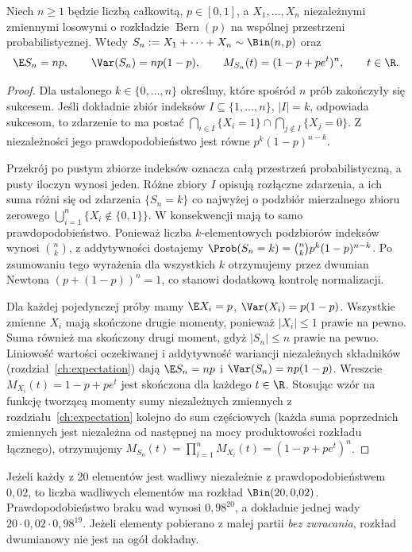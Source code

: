 \begin{twierdzenie}
Niech $n\geq1$ będzie liczbą całkowitą, $p\in[0,1]$,
a $X_1,\ldots,X_n$ niezależnymi zmiennymi losowymi
o rozkładzie $\operatorname{Bern}(p)$ na wspólnej
przestrzeni probabilistycznej. Wtedy
$S_n:=X_1+\cdots+X_n\sim\Bin(n,p)$ oraz
\[
\E S_n=np,\qquad \Var(S_n)=np(1-p),\qquad
M_{S_n}(t)=(1-p+pe^t)^n,\qquad t\in\R.
\]
\end{twierdzenie}
\begin{proof}
Dla ustalonego $k\in\{0,\ldots,n\}$ określmy,
które spośród $n$ prób zakończyły się sukcesem.
Jeśli dokładnie zbiór indeksów $I\subseteq\{1,\ldots,n\}$,
$|I|=k$, odpowiada sukcesom, to zdarzenie to ma postać
$\bigcap_{i\in I}\{X_i=1\}\cap
\bigcap_{j\notin I}\{X_j=0\}$.
Z niezależności jego prawdopodobieństwo jest równe
$p^k(1-p)^{n-k}$.

Przekrój po pustym zbiorze indeksów oznacza całą
przestrzeń probabilistyczną, a pusty iloczyn wynosi jeden.
Różne zbiory $I$ opisują rozłączne zdarzenia,
a ich suma różni się od zdarzenia $\{S_n=k\}$ co najwyżej
o podzbiór mierzalnego zbioru zerowego
$\bigcup_{i=1}^n\{X_i\notin\{0,1\}\}$.
W konsekwencji mają to samo prawdopodobieństwo. Ponieważ
liczba $k$-elementowych podzbiorów indeksów wynosi
$\binom nk$, z addytywności dostajemy
$\Prob(S_n=k)=\binom nk p^k(1-p)^{n-k}$.
Po zsumowaniu tego wyrażenia dla wszystkich $k$
otrzymujemy przez dwumian Newtona
$(p+(1-p))^n=1$, co stanowi dodatkową kontrolę normalizacji.

Dla każdej pojedynczej próby mamy
$\E X_i=p$, $\Var(X_i)=p(1-p)$.
Wszystkie zmienne $X_i$ mają skończone drugie momenty,
ponieważ $|X_i|\leq1$ prawie na pewno. Suma również
ma skończony drugi moment, gdyż $|S_n|\leq n$ prawie na pewno.
Liniowość wartości oczekiwanej i addytywność
wariancji niezależnych składników (rozdział~\ref{ch:expectation}) dają
$\E S_n=np$ i $\Var(S_n)=np(1-p)$.
Wreszcie $M_{X_i}(t)=1-p+pe^t$ jest skończona dla każdego
$t\in\R$. Stosując wzór na funkcję tworzącą momenty sumy
niezależnych zmiennych z rozdziału~\ref{ch:expectation}
kolejno do sum częściowych (każda suma poprzednich zmiennych
jest niezależna od następnej na mocy produktowości rozkładu
łącznego), otrzymujemy
$M_{S_n}(t)=\prod_{i=1}^nM_{X_i}(t)
=(1-p+pe^t)^n$.
\end{proof}

\begin{przyklad}
Jeżeli każdy z 20 elementów jest wadliwy niezależnie z
prawdopodobieństwem $0{,}02$, to liczba wadliwych elementów
ma rozkład $\Bin(20,0{,}02)$. Prawdopodobieństwo
braku wad wynosi $0{,}98^{20}$, a dokładnie jednej wady
$20\cdot0{,}02\cdot0{,}98^{19}$.
Jeżeli elementy pobierano z małej partii \emph{bez zwracania},
rozkład dwumianowy nie jest na ogół dokładny.
\end{przyklad}

